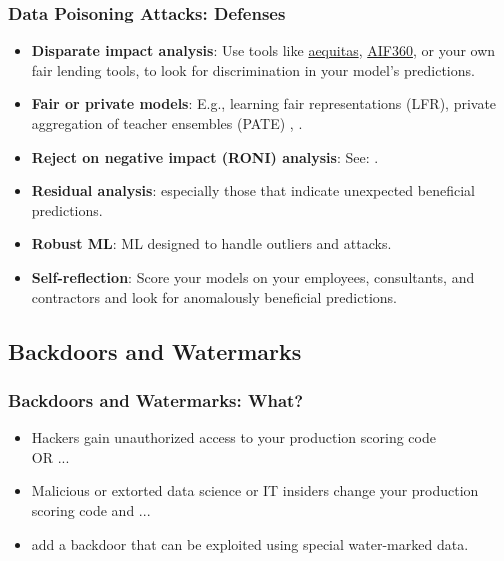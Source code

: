 \documentclass[11pt,
               aspectratio=169,
               hyperref={colorlinks}
               ]{beamer}
\begin{document}
			\begin{frame}[label={slide:data_poisoning_defense}]
		
				\frametitle{Data Poisoning Attacks: \textbf{Defenses}}
				
				\begin{itemize}
					\item \textbf{Disparate impact analysis}: Use tools like \href{https://github.com/dssg/aequitas}{aequitas}, \href{https://github.com/IBM/AIF360}{AIF360}, or your own fair lending tools, to look for discrimination in your model’s predictions. 
					\item \textbf{Fair or private models}: E.g., learning fair representations (LFR), private aggregation of teacher ensembles (PATE) \cite{pate}, \cite{lfr}.
					\item \textbf{Reject on negative impact (RONI) analysis}: See: \textit{} \cite{security_of_ml}. 		
					\item \textbf{Residual analysis}: especially those that indicate unexpected beneficial predictions.
					\item \textbf{Robust ML}: ML designed to handle outliers and attacks.
					\item \textbf{Self-reflection}: Score your models on your employees, consultants, and contractors and look for anomalously beneficial predictions.
				\end{itemize}	
			\end{frame}
		
		\subsection{Backdoors and Watermarks}
			
			\begin{frame}
		
				\frametitle{Backdoors and Watermarks: \textbf{What?}}
				\begin{itemize}
				\Large
				\item Hackers gain unauthorized access to your production scoring code \\ OR ...
				\item Malicious or extorted data science or IT insiders change your production scoring code and ...
				\item add a backdoor that can be exploited using special water-marked data.
				\end{itemize}	
			\end{frame}
		
\end{document}
